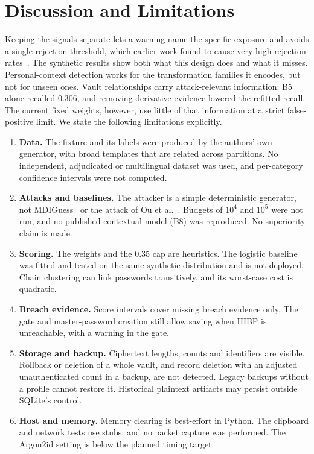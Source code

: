 \documentclass[conference]{IEEEtran}
\begin{document}
\section{Discussion and Limitations}
Keeping the signals separate lets a warning name the specific exposure and avoids a single rejection threshold, which earlier work found to cause very high rejection rates~\cite{saintjean}. The synthetic results show both what this design does and what it misses. Personal-context detection works for the transformation families it encodes, but not for unseen ones. Vault relationships carry attack-relevant information: B5 alone recalled 0.306, and removing derivative evidence lowered the refitted recall. The current fixed weights, however, use little of that information at a strict false-positive limit. We state the following limitations explicitly.
\begin{enumerate}
\item \textbf{Data.} The fixture and its labels were produced by the authors' own generator, with broad templates that are related across partitions. No independent, adjudicated or multilingual dataset was used, and per-category confidence intervals were not computed.
\item \textbf{Attacks and baselines.} The attacker is a simple deterministic generator, not MDIGuess~\cite{mdiguess} or the attack of Ou et al.~\cite{ou2026}. Budgets of $10^4$ and $10^5$ were not run, and no published contextual model (B8) was reproduced. No superiority claim is made.
\item \textbf{Scoring.} The weights and the 0.35 cap are heuristics. The logistic baseline was fitted and tested on the same synthetic distribution and is not deployed. Chain clustering can link passwords transitively, and its worst-case cost is quadratic.
\item \textbf{Breach evidence.} Score intervals cover missing breach evidence only. The gate and master-password creation still allow saving when HIBP is unreachable, with a warning in the gate.
\item \textbf{Storage and backup.} Ciphertext lengths, counts and identifiers are visible. Rollback or deletion of a whole vault, and record deletion with an adjusted unauthenticated count in a backup, are not detected. Legacy backups without a profile cannot restore it. Historical plaintext artifacts may persist outside SQLite's control.
\item \textbf{Host and memory.} Memory clearing is best-effort in Python. The clipboard and network tests use stubs, and no packet capture was performed. The Argon2id setting is below the planned timing target.

\end{enumerate}
\end{document}
